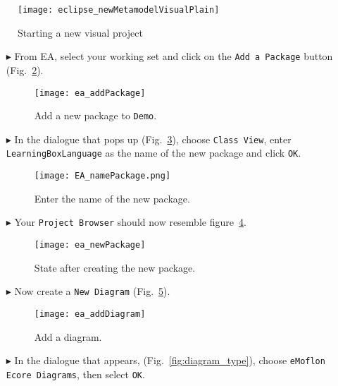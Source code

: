 \begin{figure}[htbp]
	\centering
  \texttt{[image: eclipse\_newMetamodelVisualPlain]}
	\caption{Starting a new visual project}
	\label{fig:new_visModel}
\end{figure}
\begin{itemize}

\item[$\blacktriangleright$] From EA, select your working set and click on the \texttt{Add a Package} button (Fig.~\ref{fig:new_package}).

\begin{figure}[htbp]
	\centering
  \texttt{[image: ea\_addPackage]}
	\caption{Add a new package to \texttt{Demo}.}
	\label{fig:new_package}
\end{figure}



\item[$\blacktriangleright$] In the dialogue that pops up (Fig.~\ref{fig:new_package_name}), choose \texttt{Class View}, enter \texttt{Learning\-Box\-Language} as the name of the new package and click \texttt{OK}.

\begin{figure}[htbp]
	\centering
    \texttt{[image: EA\_namePackage.png]}
	\caption{Enter the name of the new package.}
	\label{fig:new_package_name}
\end{figure}
\FloatBarrier


\vspace{0.5cm}
\item[$\blacktriangleright$] Your \texttt{Project Browser} should now resemble figure~\ref{fig:new_package_completed}.

\begin{figure}[htbp]
	\centering
  \texttt{[image: ea\_newPackage]}
	\caption{State after creating the new package.}
	\label{fig:new_package_completed}
\end{figure}
\FloatBarrier



\item[$\blacktriangleright$] Now create a \texttt{New Diagram} (Fig.~\ref{fig:diagram}).

\vspace{0.5cm}

\begin{figure}[htbp]
	\centering
  \texttt{[image: ea\_addDiagram]}
	\caption{Add a diagram.}
	\label{fig:diagram}
\end{figure}
\FloatBarrier



\item[$\blacktriangleright$] In the dialogue that appears, (Fig.~\ref{fig:diagram_type}), choose \texttt{eMoflon Ecore Diagrams}, then select \texttt{OK}.

\end{itemize}

